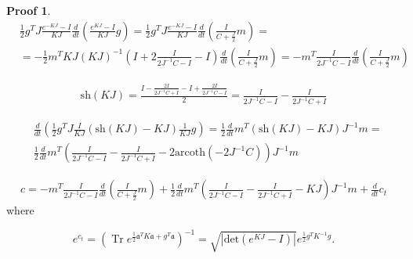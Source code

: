 \documentclass[12pt]{article}
\theoremstyle{definition}
\newtheorem*{demo}{Proof}
\newcommand\Tr{\operatorname{Tr}}
\newcommand{\mf}[1]{\mathfrak{#1}}
\begin{document}
\begin{demo}
		\begin{align*}
			&\frac{1}{2}g^TJ\frac{e^{-KJ} - I}{KJ}\frac{d}{dt}\left( \frac{e^{KJ} - I}{KJ}g  \right) = \frac{1}{2}g^TJ\frac{e^{-KJ} - I}{KJ}\frac{d}{dt}\left(\frac{I}{C + \frac{J}{2}}m\right) =\nonumber\\
			&=-\frac{1}{2}m^TKJ(KJ)^{-1}\left(I + 2\frac{I}{2J^{-1}C - I} - I\right)\frac{d}{dt}\left(\frac{I}{C + \frac{J}{2}}m\right) = -m^T\frac{I}{2J^{-1}C -  I}\frac{d}{dt}\left(\frac{I}{C + \frac{J}{2}}m\right)
		\end{align*}
		
		\begin{align*}
			\text{sh}(KJ) = \frac{I - \frac{2I}{2J^{-1}C + I} - I + \frac{2I}{2J^{-1}C - I}}{2} = \frac{I}{2J^{-1}C - I} - \frac{I}{2J^{-1}C + I}
		\end{align*}
		
		\begin{align*}
			&\frac{d}{dt}\left(  \frac{1}{2}g^TJ\frac{I}{KJ}(\text{sh}(KJ) - KJ)\frac{1}{KJ}g\right) = \frac{1}{2}\frac{d}{dt}m^T(\text{sh}(KJ) - KJ)J^{-1}m = \nonumber\\
			&\frac{1}{2}\frac{d}{dt}m^T\left( \frac{I}{2J^{-1}C - I} - \frac{I}{2J^{-1}C + I} - 2\text{arcoth}(-2J^{-1}C) \right)J^{-1}m
		\end{align*}
		
		\begin{align*}
			c = -m^T\frac{I}{2J^{-1}C -  I}\frac{d}{dt}\left(\frac{I}{C + \frac{J}{2}}m\right) + \frac{1}{2}\frac{d}{dt}m^T\left( \frac{I}{2J^{-1}C - I} - \frac{I}{2J^{-1}C + I} - KJ \right)J^{-1}m + \frac{d}{dt}c_t
		\end{align*}
		where
		
		\begin{equation}
			\label{eq:c}
			e^{c_t} = \left(\Tr e^{\frac{1}{2} \mathfrak{a}^TK\mathfrak{a} + g^T\mf{a}}\right)^{-1} = \sqrt{\left|\text{det}(e^{KJ} - I)\right|}e^{\frac{1}{2}g^TK^{-1}g}.
		\end{equation}
	\end{demo}
	
\end{document}
